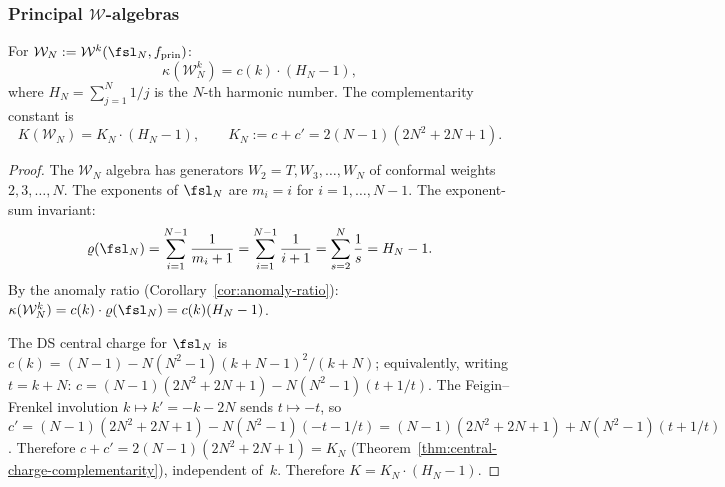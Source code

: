 \subsubsection{Principal \texorpdfstring{$\mathcal{W}$}{W}-algebras}

\begin{theorem}
\label{thm:thqg-IV-w-K}
For $\mathcal{W}_N := \mathcal{W}^k(\fsl_N, f_{\mathrm{prin}})$:
\begin{equation}\label{eq:thqg-IV-w-kappa}
\kappa(\mathcal{W}_N^k) = c(k) \cdot (H_N - 1),
\end{equation}
where $H_N = \sum_{j=1}^N 1/j$ is the $N$-th harmonic number. The complementarity constant is
\begin{equation}\label{eq:thqg-IV-w-K}
K(\mathcal{W}_N) = K_N \cdot (H_N - 1),
\qquad K_N := c + c' = 2(N{-}1)(2N^2{+}2N{+}1).
\end{equation}
\end{theorem}

\begin{proof}
The $\mathcal{W}_N$ algebra has generators $W_2 = T, W_3, \ldots, W_N$
of conformal weights $2, 3, \ldots, N$. The exponents of $\fsl_N$ are
$m_i = i$ for $i = 1, \ldots, N-1$. The exponent-sum invariant:
\[
\varrho(\fsl_N)
= \sum_{i=1}^{N-1} \frac{1}{m_i + 1}
= \sum_{i=1}^{N-1} \frac{1}{i+1}
= \sum_{s=2}^N \frac{1}{s}
= H_N - 1.
\]
By the anomaly ratio (Corollary~\ref{cor:anomaly-ratio}):
$\kappa(\mathcal{W}_N^k) = c(k) \cdot \varrho(\fsl_N) = c(k)(H_N - 1)$.

The DS central charge for $\fsl_N$ is
$c(k) = (N-1) - N(N^2-1)(k+N-1)^2/(k+N)$;
equivalently, writing $t = k+N$: $c = (N-1)(2N^2+2N+1) - N(N^2-1)(t + 1/t)$.
The Feigin--Frenkel involution $k \mapsto k' = -k - 2N$ sends $t \mapsto -t$,
so $c' = (N-1)(2N^2+2N+1) - N(N^2-1)(-t - 1/t)
= (N-1)(2N^2+2N+1) + N(N^2-1)(t + 1/t)$. Therefore
$c + c' = 2(N-1)(2N^2+2N+1) = K_N$
(Theorem~\ref{thm:central-charge-complementarity}),
independent of~$k$.
Therefore $K = K_N \cdot (H_N - 1)$.
\end{proof}

